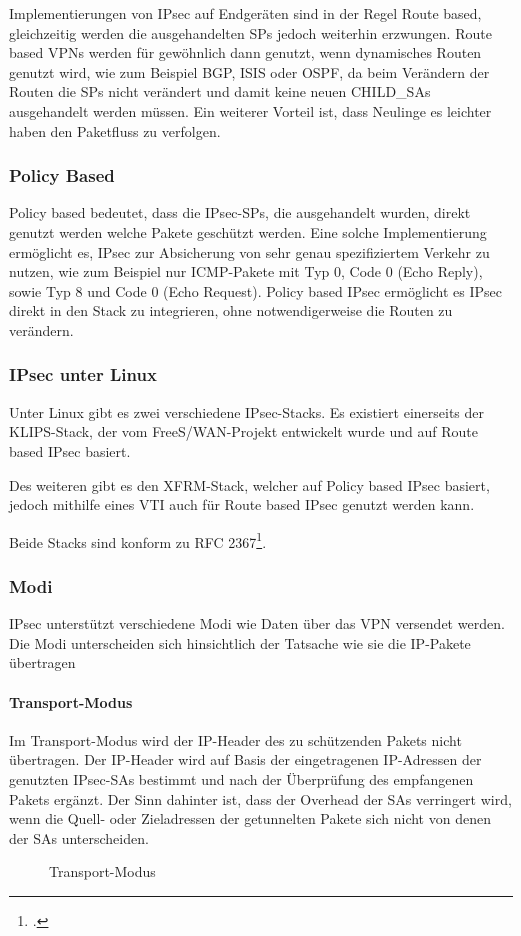 Implementierungen von IPsec auf Endgeräten sind in der Regel Route based, gleichzeitig werden
die ausgehandelten \acp{SP} jedoch weiterhin erzwungen.
Route based \acp{VPN} werden für gewöhnlich dann genutzt, wenn dynamisches Routen genutzt wird,
wie zum Beispiel \ac{BGP}, \ac{ISIS} oder \ac{OSPF}, da beim Verändern der Routen die \acp{SP} nicht verändert
und damit keine neuen CHILD\_SAs ausgehandelt werden müssen. Ein weiterer Vorteil ist, dass Neulinge es leichter haben
den Paketfluss zu verfolgen.

\subsubsection{Policy Based}
\label{subsec:policybased}
Policy based bedeutet, dass die \ac{IPsec}-\acp{SP}, die ausgehandelt wurden, direkt genutzt werden welche Pakete geschützt werden.
Eine solche Implementierung ermöglicht es, \ac{IPsec} zur Absicherung von sehr genau spezifiziertem
Verkehr zu nutzen, wie zum Beispiel nur \ac{ICMP}-Pakete mit Typ 0, Code 0 (Echo Reply), sowie Typ 8 und Code 0 (Echo Request).
Policy based \ac{IPsec} ermöglicht es \ac{IPsec} direkt in den Stack zu integrieren, ohne notwendigerweise die Routen zu verändern.

\subsubsection{IPsec unter Linux}
Unter Linux gibt es zwei verschiedene \ac{IPsec}-Stacks.
Es existiert einerseits der KLIPS-Stack, der vom FreeS/WAN-Projekt entwickelt wurde
und auf Route based IPsec basiert.

Des weiteren gibt es den XFRM-Stack, welcher auf Policy based IPsec basiert, jedoch mithilfe eines \ac{VTI}
auch für Route based IPsec genutzt werden kann.

Beide Stacks sind konform zu RFC 2367\footcite[][]{daniel_l._mcdonald_rfc_1998}.

\subsubsection{Modi}
\ac{IPsec} unterstützt verschiedene Modi wie Daten über das VPN versendet werden.
Die Modi unterscheiden sich hinsichtlich der Tatsache wie sie die \ac{IP}-Pakete übertragen
\paragraph{Transport-Modus}
Im Transport-Modus wird der \ac{IP}-Header des zu schützenden Pakets nicht übertragen.
Der IP-Header wird auf Basis der eingetragenen IP-Adressen der genutzten \ac{IPsec}-\acp{SA}
bestimmt und nach der Überprüfung des empfangenen Pakets ergänzt. Der Sinn dahinter ist, dass
der Overhead der \acp{SA} verringert wird, wenn die Quell- oder Zieladressen der getunnelten Pakete
sich nicht von denen der \acp{SA} unterscheiden.
\begin{figure}
    \caption{Transport-Modus}
    \label{fig:Transport-Modus}
    \centering
    \def\svgwidth{\columnwidth}
    
\end{figure}


